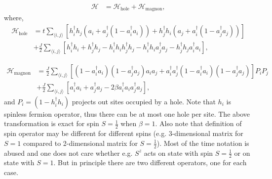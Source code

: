 \documentclass[12pt, a4paper]{article}
\newcommand{\mean}[1]{\langle#1\rangle}
\begin{document}
\begin{align}
	\mathcal{H} &= \mathcal{H}_{\text{hole}} + \mathcal{H}_{\text{magnon}},
\end{align}
	where,
\begin{equation}
	\begin{split}
	\mathcal{H}_{\text{hole}} &= t \sum_{\mean{i,j}} \left[h_i^\dag h_j \left( a_i + a_j^\dag (1 -  a_i^\dag a_i) \right) + h_j^\dag h_i \left( a_j + a_i^\dag (1 -  a_j^\dag a_j) \right)\right] \\
	&+ \frac{J}{2} \sum_{\mean{i,j}} \left[ h_i^\dag h_i + h_j^\dag h_j - h_i^\dag h_i h_j^\dag h_j - h_i^\dag h_i a_j^\dag a_j - h_j^\dag h_j a_i^\dag a_i \right],
	\end{split}
	\label{eq:ht}
\end{equation}

\begin{equation}
	\begin{aligned}
	\mathcal{H}_{\text{magnon}} &= \frac{J}{2}\sum_{\mean{i,j}} \left[(1 - a_i^\dag a_i)(1 - a_j^\dag a_j)a_i a_j + a_i^\dag a_j^\dag (1 - a_i^\dag a_i)(1 - a_j^\dag a_j) \right]P_i P_j \\
	&+ \frac{J}{2} \sum_{\mean{i,j}} \left[a_i^\dag a_i + a_j^\dag a_j - 2\beta a_i^\dag a_i a_j^\dag a_j \right],
	\end{aligned}
	\label{eq:hj}
\end{equation}
and $P_i = (1 - h_i^\dag h_i)$ projects out sites occupied by a hole. Note that $h_i$ is spinless fermion operator, thus there can be at most one hole per site. The above transformation is exact for spin $S=\frac{1}{2}$ when $\beta = 1$. Also note that definition of spin operator may be different for different spins (e.g. 3-dimensional matrix for $S=1$ compared to 2-dimensional matrix for $S=\frac{1}{2}$). Most of the time notation is abused and one does not care whether e.g. $S^z$ acts on state with spin $S=\frac{1}{2}$ or on state with $S=1$. But in principle there are two different operators, one for each case.




\end{document}
